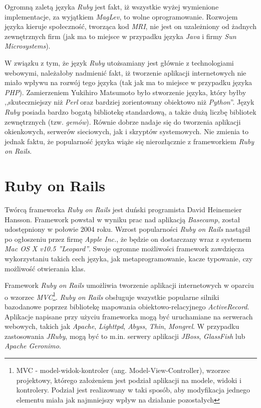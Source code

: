 \documentclass[11pt,twoside]{report}
\begin{document}
Ogromną zaletą języka \emph{Ruby} jest fakt, iż wszystkie wyżej
wymienione implementacje, za wyjątkiem \emph{MagLev}, to wolne
oprogramowanie. Rozwojem języka kieruje społeczność, tworząca kod
\emph{MRI}, nie jest on uzależniony od żadnych zewnętrznych firm (jak
ma to miejsce w przypadku języka \emph{Java} i firmy \emph{Sun
  Microsystems}).

W związku z tym, że język \emph{Ruby} utożsamiany jest głównie z
technologiami webowymi, należałoby nadmienić fakt, iż tworzenie
aplikacji internetowych nie miało wpływu na rozwój tego języka (tak
jak ma to miejsce w przypadku języka \emph{PHP}). Zamierzeniem
Yukihiro Matsumoto było stworzenie języka, który byłby
,,skuteczniejszy niż \emph{Perl} oraz bardziej zorientowany obiektowo
niż \emph{Python}''\cite{matzinterview}. Język \emph{Ruby} posiada
bardzo bogatą bibliotekę standardową, a także dużą liczbę bibliotek
zewnętrznych (tzw. \emph{gemów}). Równie dobrze nadaje się do
tworzenia aplikacji okienkowych, serwerów sieciowych, jak i skryptów
systemowych. Nie zmienia to jednak faktu, że popularność języka wiąże
się nierozłącznie z frameworkiem \emph{Ruby on Rails}.

\section{Ruby on Rails}
Twórcą frameworka \emph{Ruby on Rails} jest duński programista David
Heinemeier Hansson. Framework powstał w wyniku prac nad aplikacją
\emph{Basecamp}, został udostępniony w połowie 2004 roku. Wzrost
popularności \emph{Ruby on Rails} nastąpił po ogłoszeniu przez firmę
\emph{Apple Inc.}, że będzie on dostarczany wraz z systemem \emph{Mac
  OS X v10.5 ''Leopard''}\cite{rubyonrails}. Swoje ogromne możliwości
framework zawdzięcza wykorzystaniu takich cech języka, jak
metaprogramowanie, kacze typowanie, czy możliwość otwierania klas.

Framework \emph{Ruby on Rails} umożliwia tworzenie aplikacji
internetowych w oparciu o wzorzec \emph{MVC}\footnote{MVC -
  model-widok-kontroler (ang. Model-View-Controller), wzorzec
  projektowy, którego założeniem jest podział aplikacji na modele,
  widoki i kontrolery. Podział jest realizowany w taki sposób, aby
  modyfikacja jednego elementu miała jak najmniejszy wpływ na
  działanie pozostałych}. \emph{Ruby on Rails} obsługuje wszystkie
popularne silniki bazodanowe poprzez bibliotekę mapowania
obiektowo-relacyjnego \emph{ActiveRecord}. Aplikacje napisane przy
użyciu frameworka mogą być uruchamiane na serwerach webowych, takich
jak \emph{Apache}, \emph{Lighttpd}, \emph{Abyss}, \emph{Thin},
\emph{Mongrel}. W przypadku zastosowania \emph{JRuby}, mogą być to
m.in. serwery aplikacji \emph{JBoss}, \emph{GlassFish} lub
\emph{Apache Geronimo}.
\end{document}
